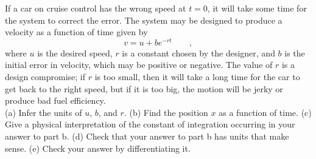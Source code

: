 If a car on cruise control has the wrong speed at $t=0$, it will take some time
for the system to correct the error. The system may be designed to
produce a velocity as a function of time given by
\begin{equation*}
  v = u+be^{-rt} \qquad ,
\end{equation*}
where $u$ is the desired speed, $r$ is a constant chosen by the designer,
and $b$ is the initial error in velocity, which may be positive or
negative. The value of $r$ is a design compromise; if $r$ is too small, then
it will take a long time for the car to get back to the right speed, but if
it is too big, the motion will be jerky or produce bad fuel efficiency.\\
(a) Infer the units of $u$, $b$, and $r$.\hwendpart
(b) Find the position $x$ as a function of time.\answercheck\hwendpart
(c) Give a physical interpretation of the constant of integration occurring in
your answer to part b.\hwendpart
(d) Check that your answer to part b has units that make sense.\hwendpart
(e) Check your answer by differentiating it.
